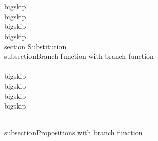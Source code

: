 \\[,i \\nPe j, \\Rq , i \\nPe j, i \\nPe j,\\]


\\bigskip
\\bigskip
\\bigskip
\\bigskip
\\section{ Substitution}
\\subsection{Branch function with branch function}
\\[, \\Blb{if(i \\Pe j)}{, \\Blb{if(j \\Pe m)}{,}{,}}{,} \\Rq , \\Blb{if(i \\Pe j)}{, \\Blb{if(i \\Pe m)}{,}{,}}{,}\\]


\\bigskip
\\bigskip
\\bigskip
\\bigskip

\\subsection{Propositions with branch function}
\\[,i \\Pe j, \\Bb{if(j \\Pe m)}{,\\Tc c_1,}{,\\Tc c_2,}, \\Rq ,i \\Pe j, \\Bb{if(i \\Pe m)}{,\\Tc c_1,}{,\\Tc c_2,}, \\]

